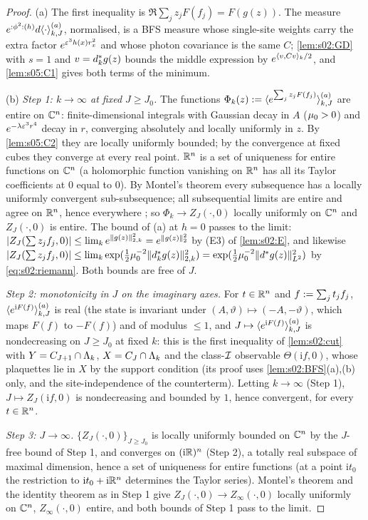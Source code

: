 \begin{proof}
(a) The first inequality is $\Re\sum_jz_jF(f_j)=F(g(z))$. The measure $e^{{:}\phi^2{:}(h)}d\langle\cdot\rangle^{(a)}_{k,J}$, normalised, is a BFS measure whose single-site weights carry the extra factor $e^{\varepsilon^3h(x)r_x^2}$ and whose photon covariance is the same $C$; \cref{lem:s02:GD} with $s=1$ and $v=d^{*}_kg(z)$ bounds the middle expression by $e^{\langle v,Cv\rangle_k/2}$, and \cref{lem:s05:C1} gives both terms of the minimum.

(b) \emph{Step 1: $k\to\infty$ at fixed $J\ge J_0$.} The functions $\Phi_k(z):=\langle e^{\sum_jz_jF(f_j)}\rangle^{(a)}_{k,J}$ are entire on $\mathbb C^n$: finite-dimensional integrals with Gaussian decay in $A$ ($\mu_0>0$) and $e^{-\lambda\varepsilon^3r^4}$ decay in $r$, converging absolutely and locally uniformly in $z$. By \cref{lem:s05:C2} they are locally uniformly bounded; by the convergence at fixed cubes they converge at every real point. $\mathbb R^n$ is a set of uniqueness for entire functions on $\mathbb C^n$ (a holomorphic function vanishing on $\mathbb R^n$ has all its Taylor coefficients at $0$ equal to $0$). By Montel's theorem every subsequence has a locally uniformly convergent sub-subsequence; all subsequential limits are entire and agree on $\mathbb R^n$, hence everywhere \cite{Hor90}; so $\Phi_k\to Z_J(\cdot,0)$ locally uniformly on $\mathbb C^n$ and $Z_J(\cdot,0)$ is entire. The bound of (a) at $h=0$ passes to the limit: $|Z_J(\sum z_jf_j,0)|\le\lim_ke^{\lVert g(z)\rVert^2_{2,k}}=e^{\lVert g(z)\rVert_2^2}$ by (E3) of \cref{lem:s02:E}, and likewise $|Z_J(\sum z_jf_j,0)|\le\lim_k\exp(\frac12\mu_0^{-2}\lVert d^{*}_kg(z)\rVert^2_{2,k})=\exp(\frac12\mu_0^{-2}\lVert d^{*} g(z)\rVert^2_{L^2})$ by \eqref{eq:s02:riemann}. Both bounds are free of $J$.

\emph{Step 2: monotonicity in $J$ on the imaginary axes.} For $t\in\mathbb R^n$ and $f:=\sum_jt_jf_j$, $\langle e^{\mathrm iF(f)}\rangle^{(a)}_{k,J}$ is real (the state is invariant under $(A,\vartheta)\mapsto(-A,-\vartheta)$, which maps $F(f)$ to $-F(f)$) and of modulus $\le1$, and $J\mapsto\langle e^{\mathrm iF(f)}\rangle^{(a)}_{k,J}$ is nondecreasing on $J\ge J_0$ at fixed $k$: this is the first inequality of \cref{lem:s02:cut} with $Y=C_{J+1}\cap\Lambda_k$, $X=C_J\cap\Lambda_k$ and the class-$\mathcal I$ observable $\Theta(\mathrm if,0)$, whose plaquettes lie in $X$ by the support condition (its proof uses \cref{lem:s02:BFS}(a),(b) only, and the site-independence of the counterterm). Letting $k\to\infty$ (Step 1), $J\mapsto Z_J(\mathrm if,0)$ is nondecreasing and bounded by $1$, hence convergent, for every $t\in\mathbb R^n$.

\emph{Step 3: $J\to\infty$.} $\{Z_J(\cdot,0)\}_{J\ge J_0}$ is locally uniformly bounded on $\mathbb C^n$ by the $J$-free bound of Step 1, and converges on $(\mathrm i\mathbb R)^n$ (Step 2), a totally real subspace of maximal dimension, hence a set of uniqueness for entire functions (at a point $\mathrm it_0$ the restriction to $\mathrm it_0+\mathrm i\mathbb R^n$ determines the Taylor series). Montel's theorem and the identity theorem as in Step 1 give $Z_J(\cdot,0)\to Z_\infty(\cdot,0)$ locally uniformly on $\mathbb C^n$, $Z_\infty(\cdot,0)$ entire, and both bounds of Step 1 pass to the limit.


\end{proof}
